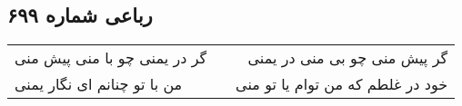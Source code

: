 \begin{center}
\section*{رباعی شماره ۶۹۹}
\label{sec:sh699}
\begin{longtable}{l p{0.5cm} r}
گر در یمنی چو با منی پیش منی
&&
گر پیش منی چو بی منی در یمنی
\\
من با تو چنانم ای نگار یمنی
&&
خود در غلطم که من توام یا تو منی
\\
\end{longtable}
\end{center}
